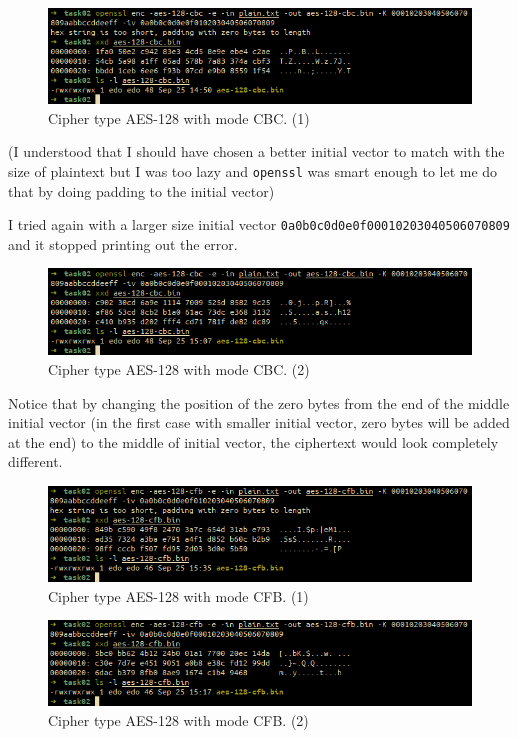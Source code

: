 \documentclass{article}
\begin{document}
\begin{figure}[!ht]
    \centering
    \includegraphics[scale=0.68]{task02_5.png}
    \caption{Cipher type AES-128 with mode CBC. (1)}
\end{figure}

(I understood that I should have chosen a better initial vector to match with the
size of plaintext but I was too lazy and \texttt{openssl} was smart enough to
let me do that by doing padding to the initial vector)

I tried again with a larger size initial vector \texttt{0a0b0c0d0e0f00010203040506070809}
and it stopped printing out the error.

\begin{figure}[!ht]
    \centering
    \includegraphics[scale=0.68]{task02_6.png}
    \caption{Cipher type AES-128 with mode CBC. (2)}
\end{figure}

Notice that by changing the position of the zero bytes from the end of the
middle initial vector (in the first case with smaller initial vector, zero bytes
will be added at the end) to the middle of initial vector, the ciphertext would
look completely different.

\begin{figure}[!ht]
    \centering
    \includegraphics[scale=0.68]{task02_9.png}
    \caption{Cipher type AES-128 with mode CFB. (1)}
\end{figure}

\begin{figure}[!ht]
    \centering
    \includegraphics[scale=0.68]{task02_7.png}
    \caption{Cipher type AES-128 with mode CFB. (2)}
\end{figure}
\end{document}
